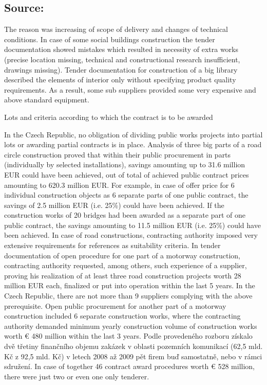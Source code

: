 \documentclass[10pt]{article}
\begin{document}
\subsection*{Source:}

The reason was increasing of scope of delivery and changes of technical conditions.
In case of some social buildings construction the tender documentation showed mistakes which resulted in necessity of extra works (precise location missing, technical and constructional research insufficient, drawings missing).
Tender documentation for construction of a big library described the elements of interior only without specifying product quality requirements.
As a result, some sub suppliers provided some very expensive and above standard equipment.


Lots and criteria according to which the contract is to be awarded

In the Czech Republic, no obligation of dividing public works projects into partial lots or awarding partial contracts is in place.
Analysis of three big parts of a road circle construction proved that within their public procurement in parts (individually by selected installations), savings amounting up to 31.6 million EUR could have been achieved, out of total of achieved public contract prices amounting to 620.3 million EUR.
For example, in case of offer price for 6 individual construction objects as 6 separate parts of one public contract, the savings of 2.5 million EUR (i.e. 25\%) could have been achieved.
If the construction works of 20 bridges had been awarded as a separate part of one public contract, the savings amounting to 11.5 million EUR (i.e. 25\%) could have been achieved.
In case of road constructions, contracting authority imposed very extensive requirements for references as suitability criteria.
In tender documentation of open procedure for one part of a motorway construction, contracting authority requested, among others, such experience of a supplier, proving his realization of at least three road construction projects worth 28 million EUR each, finalized or put into operation within the last 5 years.
In the Czech Republic, there are not more than 9 suppliers complying with the above prerequisite.
Open public procurement for another part of a motorway construction included 6 separate construction works, where the contracting authority demanded minimum yearly construction volume of construction works worth € 480 million within the last 3 years.
Podle provedeného rozboru získalo dvě třetiny finančního objemu zakázek v oblasti pozemních komunikací (62,5 mld. Kč z 92,5 mld. Kč) v letech 2008 až 2009 pět firem buď samostatně, nebo v rámci sdružení.
In case of together 46 contract award procedures worth € 528 million, there were just two or even one only tenderer.
\end{document}
